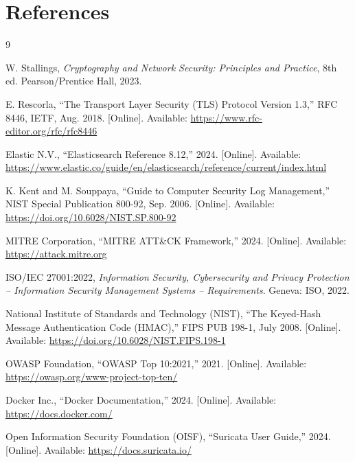 \documentclass[12pt,a4paper]{report}
\begin{document}
\chapter*{References}

\begin{thebibliography}{9}

W. Stallings,
\textit{Cryptography and Network Security: Principles and Practice}, 8th ed.
Pearson/Prentice Hall, 2023.

E. Rescorla,
``The Transport Layer Security (TLS) Protocol Version 1.3,''
RFC 8446, IETF, Aug. 2018. [Online].
Available: \url{https://www.rfc-editor.org/rfc/rfc8446}

Elastic N.V.,
``Elasticsearch Reference 8.12,'' 2024. [Online].
Available: \url{https://www.elastic.co/guide/en/elasticsearch/reference/current/index.html}

K. Kent and M. Souppaya,
``Guide to Computer Security Log Management,''
NIST Special Publication 800-92, Sep. 2006. [Online].
Available: \url{https://doi.org/10.6028/NIST.SP.800-92}

MITRE Corporation,
``MITRE ATT\&CK Framework,'' 2024. [Online].
Available: \url{https://attack.mitre.org}

ISO/IEC 27001:2022,
\textit{Information Security, Cybersecurity and Privacy Protection --
Information Security Management Systems -- Requirements}.
Geneva: ISO, 2022.

National Institute of Standards and Technology (NIST),
``The Keyed-Hash Message Authentication Code (HMAC),''
FIPS PUB 198-1, July 2008. [Online].
Available: \url{https://doi.org/10.6028/NIST.FIPS.198-1}

OWASP Foundation,
``OWASP Top 10:2021,'' 2021. [Online].
Available: \url{https://owasp.org/www-project-top-ten/}

Docker Inc.,
``Docker Documentation,'' 2024. [Online].
Available: \url{https://docs.docker.com/}

Open Information Security Foundation (OISF),
``Suricata User Guide,'' 2024. [Online].
Available: \url{https://docs.suricata.io/}

\end{thebibliography}
\end{document}
